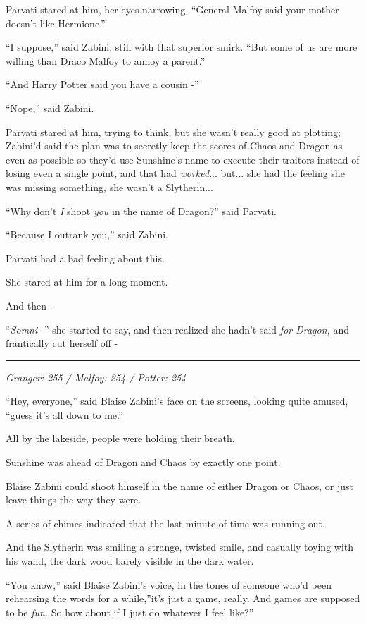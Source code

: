 Parvati stared at him, her eyes narrowing. ``General Malfoy said your
mother doesn't like Hermione.''

``I suppose,'' said Zabini, still with that superior smirk. ``But some
of us are more willing than Draco Malfoy to annoy a parent.''

``And Harry Potter said you have a cousin -''

``Nope,'' said Zabini.

Parvati stared at him, trying to think, but she wasn't really good at
plotting; Zabini'd said the plan was to secretly keep the scores of
Chaos and Dragon as even as possible so they'd use Sunshine's name to
execute their traitors instead of losing even a single point, and that
had \emph{worked}... but... she had the feeling she was
missing something, she wasn't a Slytherin...

``Why don't \emph{I} shoot \emph{you} in the name of Dragon?'' said
Parvati.

``Because I outrank you,'' said Zabini.

Parvati had a bad feeling about this.

She stared at him for a long moment.

And then -

``\emph{Somni-} '' she started to say, and then realized she hadn't said
\emph{for Dragon,} and frantically cut herself off -

\begin{center}\rule{3in}{0.4pt}\end{center}

\emph{Granger: 255 / Malfoy: 254 / Potter: 254}

``Hey, everyone,'' said Blaise Zabini's face on the screens, looking
quite amused, ``guess it's all down to me.''

All by the lakeside, people were holding their breath.

Sunshine was ahead of Dragon and Chaos by exactly one point.

Blaise Zabini could shoot himself in the name of either Dragon or Chaos,
or just leave things the way they were.

A series of chimes indicated that the last minute of time was running
out.

And the Slytherin was smiling a strange, twisted smile, and casually
toying with his wand, the dark wood barely visible in the dark water.

``You know,'' said Blaise Zabini's voice, in the tones of someone who'd
been rehearsing the words for a while,''it's just a game, really. And
games are supposed to be \emph{fun.} So how about if I just do whatever
I feel like?''
